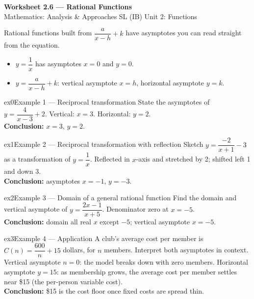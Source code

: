 \documentclass[11pt]{article}
\begin{document}
\begin{center}
{\LARGE\bfseries\color{titleblue}Worksheet 2.6 --- Rational Functions}\\[2pt]
{\small Mathematics: Analysis \& Approaches SL (IB) \textperiodcentered{} Unit 2: Functions}
\end{center}

\begin{ideabox}
Rational functions built from $\dfrac{a}{x-h}+k$ have asymptotes you can read straight from the equation.
\begin{itemize}[leftmargin=*,itemsep=2pt]
  \item $y=\dfrac1x$ has asymptotes $x=0$ and $y=0$.
  \item $y=\dfrac{a}{x-h}+k$: vertical asymptote $x=h$, horizontal asymptote $y=k$.
\end{itemize}
\end{ideabox}


\begin{example}{ex0}{Example 1 --- Reciprocal transformation}
State the asymptotes of $y=\dfrac{4}{x-3}+2$.\soln
Vertical: $x=3$. Horizontal: $y=2$.\\[3pt]\textbf{Conclusion:} $x=3$, $y=2$.
\end{example}

\begin{example}{ex1}{Example 2 --- Reciprocal transformation with reflection}
Sketch $y=\dfrac{-2}{x+1}-3$ as a transformation of $y=\dfrac1x$.\soln
Reflected in $x$-axis and stretched by 2; shifted left 1 and down 3.\\[3pt]\textbf{Conclusion:} asymptotes $x=-1$, $y=-3$.
\end{example}

\begin{example}{ex2}{Example 3 --- Domain of a general rational function}
Find the domain and vertical asymptote of $y=\dfrac{2x-1}{x+5}$.\soln
Denominator zero at $x=-5$.\\[3pt]\textbf{Conclusion:} domain all real $x$ except $-5$; vertical asymptote $x=-5$.
\end{example}

\begin{example}{ex3}{Example 4 --- Application}
A club's average cost per member is $C(n)=\dfrac{600}{n}+15$ dollars, for $n$ members. Interpret both asymptotes in context.\soln
Vertical asymptote $n=0$: the model breaks down with zero members. Horizontal asymptote $y=15$: as membership grows, the average cost per member settles near \$15 (the per-person variable cost).\\[3pt]\textbf{Conclusion:} \$15 is the cost floor once fixed costs are spread thin.
\end{example}
\end{document}
